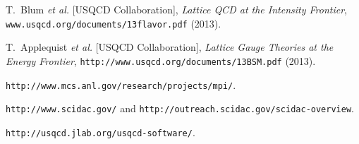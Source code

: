 \begin{thebibliography}{99}

  
T.~Blum {\em et al.} [USQCD Collaboration],
{\em Lattice QCD at the Intensity Frontier},
{\tt www.usqcd.org/documents/13flavor.pdf} (2013).

T.~Applequist {\em et al.} [USQCD Collaboration],
{\em Lattice Gauge Theories at the Energy Frontier},
{\tt http://www.usqcd.org/documents/13BSM.pdf} (2013).

{\tt http://www.mcs.anl.gov/research/projects/mpi/}.

{\tt http://www.scidac.gov/} and {\tt http://outreach.scidac.gov/scidac-overview}.
  
{\tt http://usqcd.jlab.org/usqcd-software/}.

\end{thebibliography}
